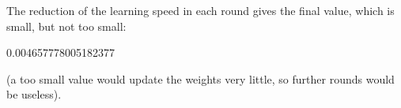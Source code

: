 \documentclass[a4paper,12pt,polish]{jupyterBook}
\begin{document}
\sphinxAtStartPar
The reduction of the learning speed in each round gives the final value, which is small, but not too small:
\begin{sphinxVerbatimInput}

\begin{sphinxVerbatim}[commandchars=\\\{\}]
\end{sphinxVerbatim}
\end{sphinxVerbatimInput}
\begin{sphinxVerbatimOutput}

\begin{sphinxVerbatim}[commandchars=\\\{\}]
0.004657778005182377
\end{sphinxVerbatim}
\end{sphinxVerbatimOutput}

\sphinxAtStartPar
(a too small value would update the weights very little, so further rounds would be useless).
\end{document}
